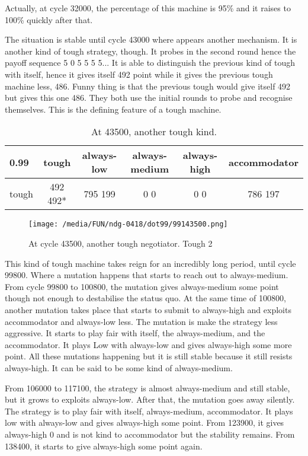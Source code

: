 \documentclass[12.5pt]{report}
\begin{document}
Actually, at cycle 32000, the percentage of this machine is 95\% and it raises to 100\% quickly after that.

The situation is stable until cycle 43000 where appears another mechanism. It is another kind of tough strategy, though. It probes in the second round hence the payoff sequence 5 0 5 5 5 5... It is able to distinguish the previous kind of tough with itself, hence it gives itself 492 point while it gives the previous tough machine less, 486. Funny thing is that the previous tough would give itself 492 but gives this one 486. They both use the initial rounds to probe and recognise themselves. This is the defining feature of a tough machine.

\begin{table}[h!]
\center
\begin{tabular}{l|ccccc}
\textbf{0.99}& tough & always-low & always-medium & always-high & accommodator\\
\hline
tough & 492 492* & 795 199  &  0 0  & 0 0  &  786 197  \\
\end{tabular}
\caption{At 43500, another tough kind.}
\end{table}
\begin{figure}[h!]
\center
\texttt{[image: /media/FUN/ndg-0418/dot99/99143500.png]}
\caption{At cycle 43500, another tough negotiator. Tough 2}
\end{figure}

This kind of tough machine takes reign for an incredibly long period, until cycle 99800. Where a mutation happens that starts to reach out to always-medium. From cycle 99800 to 100800, the mutation gives always-medium some point though not enough to destabilise the status quo. At the same time of 100800, another mutation takes place that starts to submit to always-high and exploits accommodator and always-low less. The mutation is make the strategy less aggressive. It starts to play fair with itself, the always-medium, and the accommodator. It plays Low with always-low and gives always-high some more point. All these mutations happening but it is still stable because it still resists always-high. It can be said to be some kind of always-medium.

From 106000 to 117100, the strategy is almost always-medium and still stable, but it grows to exploits always-low. After that, the mutation goes away silently. The strategy is to play fair with itself, always-medium, accommodator. It plays low with always-low and gives always-high some point. From 123900, it gives always-high 0 and is not kind to accommodator but the stability remains. From 138400, it starts to give always-high some point again.
\end{document}

